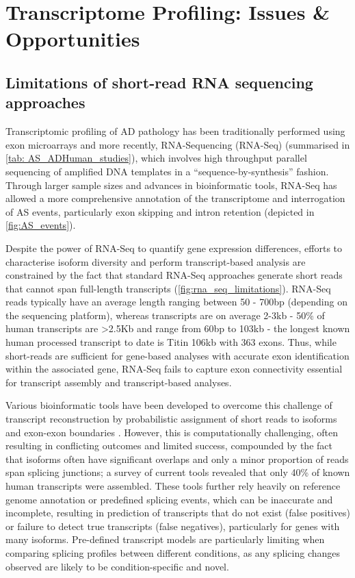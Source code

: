 \section{Transcriptome Profiling: Issues \& Opportunities}
\subsection{Limitations of short-read RNA sequencing approaches}
\label{rnaseq_intro}
Transcriptomic profiling of AD pathology has been traditionally performed using exon microarrays and more recently, RNA-Sequencing (RNA-Seq) (summarised in \cref{tab: AS_ADHuman_studies}), which involves high throughput parallel sequencing of amplified DNA templates in a “sequence-by-synthesis” fashion. Through larger sample sizes and advances in bioinformatic tools, RNA-Seq has allowed a more comprehensive annotation of the transcriptome and interrogation of AS events, particularly exon skipping and intron retention (depicted in \cref{fig:AS_events}). 

Despite the power of RNA-Seq to quantify gene expression differences, efforts to characterise isoform diversity and perform transcript-based analysis are constrained by the fact that standard RNA-Seq approaches generate short reads that cannot span full-length transcripts (\cref{fig:rna_seq_limitations}). RNA-Seq reads typically have an average length ranging between 50 - 700bp (depending on the sequencing platform), whereas transcripts are on average 2-3kb - 50\% of human transcripts are >2.5Kb\cite{Sharon2013} and range from 60bp to 103kb \cite{Piovesan2016,Sharon2013} - the longest known human processed transcript to date is Titin 106kb with 363 exons\cite{Bang2001}. Thus, while short-reads are sufficient for gene-based analyses with accurate exon identification within the associated gene, RNA-Seq fails to capture exon connectivity essential for transcript assembly and transcript-based analyses\cite{Gordon2015}\cite{Wang2016}. 

Various bioinformatic tools have been developed to overcome this challenge of transcript reconstruction by probabilistic assignment of short reads to isoforms and exon-exon boundaries \cite{Trapnell2010, Kingsford2010, Au2013}. However, this is computationally challenging, often resulting in conflicting outcomes and limited success\cite{Steijger2013}, compounded by the fact that isoforms often have significant overlaps and only a minor proportion of reads span splicing junctions; a survey of current tools revealed that only 40\% of known human transcripts were assembled\cite{Steijger2013}. These tools further rely heavily on reference genome annotation or predefined splicing events, which can be inaccurate and incomplete, resulting in prediction of transcripts that do not exist (false positives) or failure to detect true transcripts (false negatives), particularly for genes with many isoforms\cite{Au2013}. Pre-defined transcript models are particularly limiting when comparing splicing profiles between different conditions, as any splicing changes observed are likely to be condition-specific and novel. 

